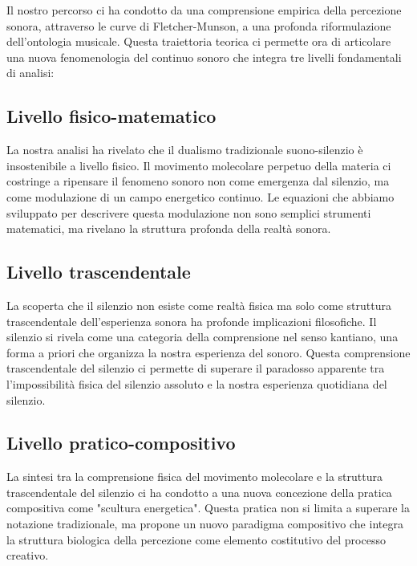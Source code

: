 \documentclass[a4paper,11pt]{article}
\begin{document}
Il nostro percorso ci ha condotto da una comprensione empirica della
percezione sonora, attraverso le curve di Fletcher-Munson, a una
profonda riformulazione dell'ontologia musicale. Questa traiettoria
teorica ci permette ora di articolare una nuova fenomenologia del
continuo sonoro che integra tre livelli fondamentali di analisi:

\subsection{Livello fisico-matematico}\hypertarget{livello-fisico-matematico}{}\label{livello-fisico-matematico}

La nostra analisi ha rivelato che il dualismo tradizionale
suono-silenzio è insostenibile a livello fisico. Il movimento molecolare
perpetuo della materia ci costringe a ripensare il fenomeno sonoro non
come emergenza dal silenzio, ma come modulazione di un campo energetico
continuo. Le equazioni che abbiamo sviluppato per descrivere questa
modulazione non sono semplici strumenti matematici, ma rivelano la
struttura profonda della realtà sonora.

\subsection{Livello trascendentale}\hypertarget{livello-trascendentale}{}\label{livello-trascendentale}

La scoperta che il silenzio non esiste come realtà fisica ma solo come
struttura trascendentale dell'esperienza sonora ha profonde implicazioni
filosofiche. Il silenzio si rivela come una categoria della comprensione
nel senso kantiano, una forma a priori che organizza la nostra
esperienza del sonoro. Questa comprensione trascendentale del silenzio
ci permette di superare il paradosso apparente tra l'impossibilità
fisica del silenzio assoluto e la nostra esperienza quotidiana del
silenzio.

\subsection{Livello pratico-compositivo}\hypertarget{livello-pratico-compositivo}{}\label{livello-pratico-compositivo}

La sintesi tra la comprensione fisica del movimento molecolare e la
struttura trascendentale del silenzio ci ha condotto a una nuova
concezione della pratica compositiva come "scultura energetica".
Questa pratica non si limita a superare la notazione tradizionale, ma
propone un nuovo paradigma compositivo che integra la struttura
biologica della percezione come elemento costitutivo del processo
creativo.
\end{document}
